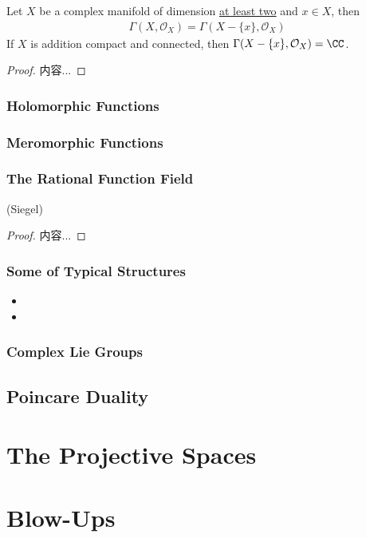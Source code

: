 \documentclass[Total.tex]{subfiles}
\begin{document}
					\begin{corollary}
						Let $X$ be a complex manifold of dimension \underline{at least two} and $x\in X$, then
						\begin{gather*}
							\Gamma(X,\mathcal{O}_X)=\Gamma(X-\{x\},\mathcal{O}_X)
						\end{gather*}
						If $X$ is addition compact and connected, then $\Gamma(X-\{x\},\mathcal{O}_X)=\CC$.
					\end{corollary}
					\begin{proof}
						内容...
					\end{proof}
				\subsubsection{Holomorphic Functions}
				\subsubsection{Meromorphic Functions}
				\subsubsection{The Rational Function Field}
					\begin{proposition}
						(Siegel)
					\end{proposition}
					\begin{proof}
						内容...
					\end{proof}
				\subsubsection{Some of Typical Structures}
					\begin{itemize}
						\item 
						\item 
					\end{itemize}
				\subsubsection{Complex Lie Groups}
			\subsection{Poincare Duality}
		\section{The Projective Spaces}	
		\section{Blow-Ups}
\end{document}
